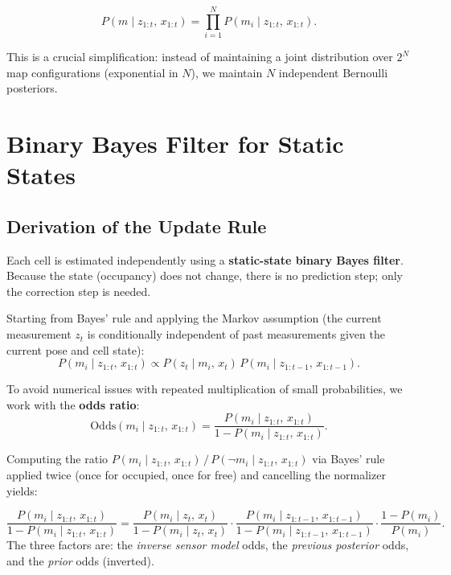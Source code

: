 \documentclass[11pt,a4paper]{article}
\theoremstyle{definition}
\theoremstyle{plain}
\theoremstyle{remark}
\begin{document}
\begin{tcolorbox}[colback=blue!5!white,colframe=blue!75!black,title=\textbf{Map Posterior Factorization}]
\[
    P(m \mid z_{1:t},\, x_{1:t})
    = \prod_{i=1}^{N} P(m_i \mid z_{1:t},\, x_{1:t}).
\]
\end{tcolorbox}

This is a crucial simplification: instead of maintaining a joint distribution over $2^N$ map configurations (exponential in $N$), we maintain $N$ independent Bernoulli posteriors.

\section{Binary Bayes Filter for Static States}

\subsection{Derivation of the Update Rule}

Each cell is estimated independently using a \textbf{static-state binary Bayes filter}. Because the state (occupancy) does not change, there is no prediction step; only the correction step is needed.

Starting from Bayes' rule and applying the Markov assumption (the current measurement $z_t$ is conditionally independent of past measurements given the current pose and cell state):
\[
    P(m_i \mid z_{1:t},\, x_{1:t})
    \propto P(z_t \mid m_i,\, x_t)\, P(m_i \mid z_{1:t-1},\, x_{1:t-1}).
\]

To avoid numerical issues with repeated multiplication of small probabilities, we work with the \textbf{odds ratio}:
\[
    \text{Odds}(m_i \mid z_{1:t},\, x_{1:t})
    = \frac{P(m_i \mid z_{1:t},\, x_{1:t})}{1 - P(m_i \mid z_{1:t},\, x_{1:t})}.
\]

Computing the ratio $P(m_i \mid z_{1:t},\, x_{1:t})\,/\,P(\lnot m_i \mid z_{1:t},\, x_{1:t})$ via Bayes' rule applied twice (once for occupied, once for free) and cancelling the normalizer yields:

\begin{tcolorbox}[colback=blue!5!white,colframe=blue!75!black,title=\textbf{Odds Update Rule}]
\[
    \frac{P(m_i \mid z_{1:t},\, x_{1:t})}{1 - P(m_i \mid z_{1:t},\, x_{1:t})}
    =
    \frac{P(m_i \mid z_t,\, x_t)}{1 - P(m_i \mid z_t,\, x_t)}
    \cdot
    \frac{P(m_i \mid z_{1:t-1},\, x_{1:t-1})}{1 - P(m_i \mid z_{1:t-1},\, x_{1:t-1})}
    \cdot
    \frac{1 - P(m_i)}{P(m_i)}.
\]
The three factors are: the \emph{inverse sensor model} odds, the \emph{previous posterior} odds, and the \emph{prior} odds (inverted).
\end{tcolorbox}
\end{document}
